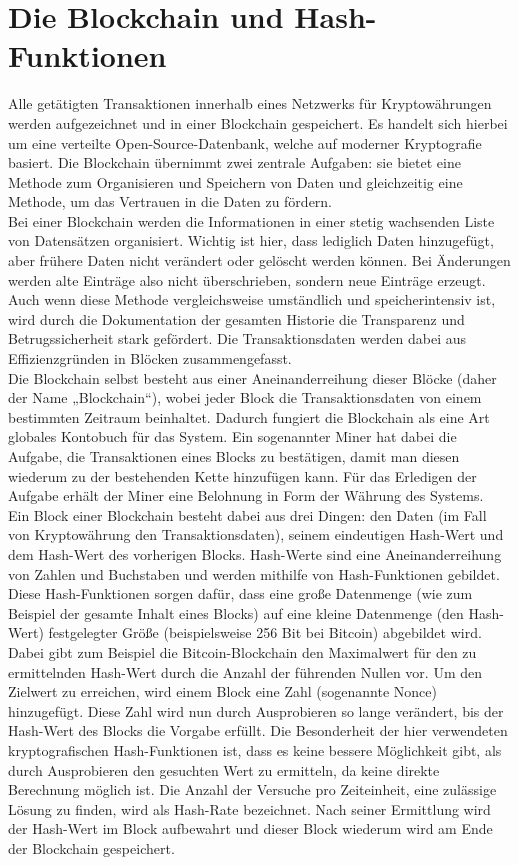 \documentclass[12pt]{article}
\begin{document}
\section{Die Blockchain und Hash-Funktionen}
Alle getätigten Transaktionen innerhalb eines Netzwerks für Kryptowährungen werden aufgezeichnet und in einer Blockchain gespeichert. Es handelt sich hierbei um eine verteilte Open-Source-Datenbank, welche auf moderner Kryptografie basiert. Die Blockchain übernimmt zwei zentrale Aufgaben: sie bietet eine Methode zum Organisieren und Speichern von Daten und gleichzeitig eine Methode, um das Vertrauen in die Daten zu fördern.\\
Bei einer Blockchain werden die Informationen in einer stetig wachsenden Liste von Datensätzen organisiert. Wichtig ist hier, dass lediglich Daten hinzugefügt, aber frühere Daten nicht verändert oder gelöscht werden können. Bei Änderungen werden alte Einträge also nicht überschrieben, sondern neue Einträge erzeugt. Auch wenn diese Methode vergleichsweise umständlich und speicherintensiv ist, wird durch die Dokumentation der gesamten Historie die Transparenz und Betrugssicherheit stark gefördert. Die Transaktionsdaten werden dabei aus Effizienzgründen in Blöcken zusammengefasst.\\
Die Blockchain selbst besteht aus einer Aneinanderreihung dieser Blöcke (daher der Name „Blockchain“), wobei jeder Block die Transaktionsdaten von einem bestimmten Zeitraum beinhaltet. Dadurch fungiert die Blockchain als eine Art globales Kontobuch für das System. Ein sogenannter Miner hat dabei die Aufgabe, die Transaktionen eines Blocks zu bestätigen, damit man diesen wiederum zu der bestehenden Kette hinzufügen kann. Für das Erledigen der Aufgabe erhält der Miner eine Belohnung in Form der Währung des Systems.\\
Ein Block einer Blockchain besteht dabei aus drei Dingen: den Daten (im Fall von Kryptowährung den Transaktionsdaten), seinem eindeutigen Hash-Wert und dem Hash-Wert des vorherigen Blocks. Hash-Werte sind eine Aneinanderreihung von Zahlen und Buchstaben und werden mithilfe von Hash-Funktionen gebildet. Diese Hash-Funktionen sorgen dafür, dass eine große Datenmenge (wie zum Beispiel der gesamte Inhalt eines Blocks) auf eine kleine Datenmenge (den Hash-Wert) festgelegter Größe (beispielsweise 256 Bit bei Bitcoin) abgebildet wird. Dabei gibt zum Beispiel die Bitcoin-Blockchain den Maximalwert für den zu ermittelnden Hash-Wert durch die Anzahl der führenden Nullen vor. Um den Zielwert zu erreichen, wird einem Block eine Zahl (sogenannte Nonce) hinzugefügt. Diese Zahl wird nun durch Ausprobieren so lange verändert, bis der Hash-Wert des Blocks die Vorgabe erfüllt. Die Besonderheit der hier verwendeten kryptografischen Hash-Funktionen ist, dass es keine bessere Möglichkeit gibt, als durch Ausprobieren den gesuchten Wert zu ermitteln, da keine direkte Berechnung möglich ist. Die Anzahl der Versuche pro Zeiteinheit, eine zulässige Lösung zu finden, wird als Hash-Rate bezeichnet. Nach seiner Ermittlung wird der Hash-Wert im Block aufbewahrt und dieser Block wiederum wird am Ende der Blockchain gespeichert.\\
\end{document}
